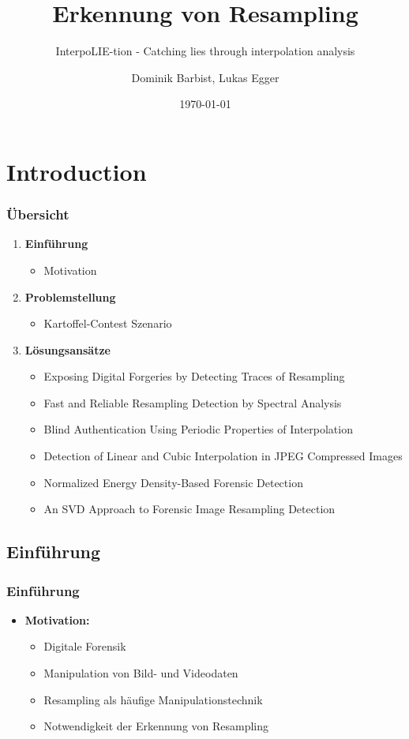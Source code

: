 \documentclass[11pt,t,usepdftitle=false,aspectratio=169]{beamer}
\title[Erkennung von Resampling]{Erkennung von Resampling}
\subtitle{InterpoLIE-tion - Catching lies through interpolation analysis}
\author[Dominik Barbist, Lukas Egger]{Dominik Barbist, Lukas Egger \\ \vspace{0.5em}}
\date{\today}
\begin{document}
\section{Introduction}

\begin{frame}
	\frametitle{Übersicht}
	\begin{enumerate}
		\item \textbf{Einführung}
		\begin{itemize}
			\item Motivation
		\end{itemize}
		\item \textbf{Problemstellung}
		\begin{itemize}
			\item Kartoffel-Contest Szenario
		\end{itemize}
		\item \textbf{Lösungsansätze}
		\begin{itemize}
			\item Exposing Digital Forgeries by Detecting Traces of Resampling
			\item Fast and Reliable Resampling Detection by Spectral Analysis
			\item Blind Authentication Using Periodic Properties of Interpolation
			\item Detection of Linear and Cubic Interpolation in JPEG Compressed Images
			\item Normalized Energy Density-Based Forensic Detection
			\item An SVD Approach to Forensic Image Resampling Detection
		\end{itemize}
	\end{enumerate}
\end{frame}

\subsection{Einführung}

\begin{frame}
	\frametitle{Einführung}
	\begin{itemize}
		\item \textbf{Motivation:} 
		\begin{itemize}
			\item Digitale Forensik
			\item Manipulation von Bild- und Videodaten
			\item Resampling als häufige Manipulationstechnik
			\item Notwendigkeit der Erkennung von Resampling
		\end{itemize}
	\end{itemize}
\end{frame}
\end{document}

